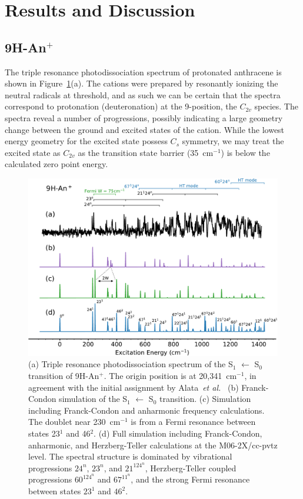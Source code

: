 \documentclass[journal=jpcafh,manuscript=article,layout=onecolumn, 12pt]{achemso}
\begin{document}
\section{Results and Discussion}
\subsection{9H-An$^+$}
The triple resonance photodissociation spectrum of protonated anthracene is shown in Figure~\ref{Fig:4}(a). The cations were prepared by resonantly ionizing the neutral radicals at threshold, and as such we can be certain that the spectra correspond to protonation (deuteronation) at the 9-position, the $C_{2v}$ species. The spectra reveal a number of progressions, possibly indicating a large geometry change between the ground and excited states of the cation. While the lowest energy geometry for the excited state possess $C_s$ symmetry, we may treat the excited state as $C_{2v}$ as the transition state barrier (35~cm$^{-1}$) is below the calculated zero point energy.  

\begin{figure} [th!]
	\includegraphics[width=1\textwidth]{figures/M9H-An+sw}
	\caption{(a) Triple resonance photodissociation spectrum of the S$_1$ $\leftarrow$ S$_0$  transition of 9H-An$^+$. The origin position is at 20,341~cm$^{-1}$, in agreement with the initial assignment by Alata~\emph{et al.}~\cite{ala10} (b) Franck-Condon simulation of the S$_1$ $\leftarrow$ S$_0$  transition. (c) Simulation including Franck-Condon and anharmonic frequency calculations. The doublet near 230~cm$^{-1}$ is from a Fermi resonance between states 23$^1$ and 46$^2$. (d) Full simulation including Franck-Condon, anharmonic, and Herzberg-Teller calculations at the M06-2X/cc-pvtz level. The spectral structure is dominated by vibrational progressions $24^n$, $23^n$, and $21^124^n$, Herzberg-Teller coupled progressions $60^124^n$ and $67^11^n$, and the strong Fermi resonance between states $23^1$ and $46^2$. }
	\label{Fig:4}
\end{figure}
\end{document}
